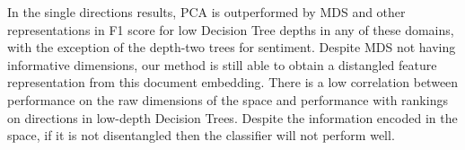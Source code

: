 In the single directions results, PCA is outperformed by MDS and other representations in F1 score for low Decision Tree depths in any of these domains, with the exception of the depth-two trees for sentiment. Despite MDS not having informative dimensions, our method is still able to obtain a distangled feature representation from this document embedding. There is a low correlation  between performance on the raw dimensions of the space and performance with rankings on directions in low-depth Decision Trees.  Despite the information encoded in the space, if it is not disentangled then the classifier will not perform well.


